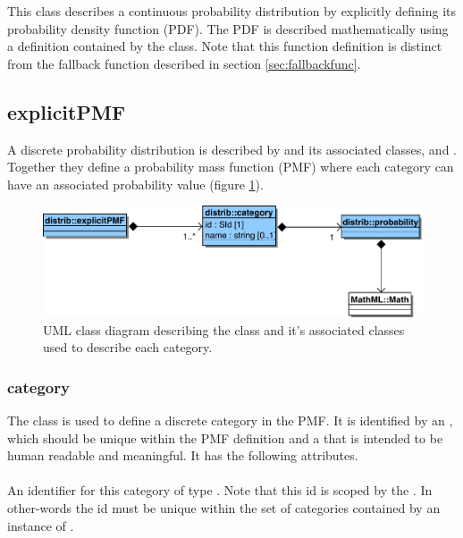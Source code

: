 \documentclass[draftspec]{sbmlpkgspec}
\begin{document}
This class describes a continuous probability distribution by explicitly
defining its probability density function (PDF). The PDF is described
mathematically using a \mathml definition contained by the
 class. Note that this function definition is
distinct from the fallback function described in section \ref{sec:fallbackfunc}.

\subsection{explicitPMF}

A discrete probability distribution is described by
 and its associated classes,  and
. Together they define a probability mass function
(PMF) where each category can have an associated probability value
(figure \ref{fig:explicitpmf}).

\begin{figure}[htb]
\includegraphics[width=0.75\linewidth]{explicitPMFUML.pdf}
\caption{UML class diagram describing the 
  class and it's associated classes used to describe each category.}
\label{fig:explicitpmf}
\end{figure}

\subsubsection{category}

The  class is used to define a discrete category in
the PMF. It is identified by an , which should be unique
within the PMF definition and a  that is intended
to be human readable and meaningful. It has the following attributes.

\paragraph{}

An identifier for this category of type . Note that this id
is scoped by the . In other-words the id must be
unique within the set of categories contained by an instance of
.
\end{document}
